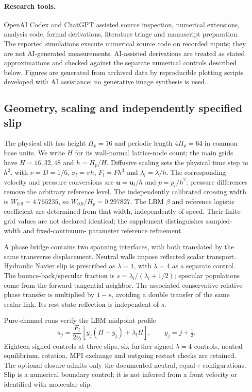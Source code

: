 \documentclass[preprint,12pt]{elsarticle}
\begin{document}
\paragraph{Research tools.}
OpenAI Codex and ChatGPT assisted source inspection, numerical
extensions, analysis code, formal derivations, literature triage and manuscript
preparation. The reported simulations execute numerical source code on
recorded inputs; they are not AI-generated measurements.
AI-assisted derivations are treated as stated approximations and checked
against the separate numerical controls described below.
Figures are generated from archived data by reproducible plotting scripts
developed with AI assistance; no generative image synthesis is used.

\subsection{Geometry, scaling and independently specified slip}
The physical slit has height $H_p=16$ and periodic length $4H_p=64$ in common
base units. We write $H$ for its wall-normal lattice-node count; the main
grids have $H=16,32,48$ and $h=H_p/H$. Diffusive scaling sets the physical
time step to $h^2$, with $\nu=D=1/6$, $\sigma_l=\sigma h$,
$F_l=Fh^3$ and $\lambda_l=\lambda/h$.
The corresponding velocity and pressure conversions are $\bm u=\bm u_l/h$
and $p=p_l/h^2$; pressure differences remove the arbitrary reference level.
The independently calibrated crossing width is
$W_{0.9}=4.765235$, so $W_{0.9}/H_p=0.297827$.
The LBM $\beta$ and reference logistic coefficient are determined from that
width, independently of speed. Their finite-grid values are not declared
identical; the supplement distinguishes sampled-width and fixed-continuum-
parameter reference refinement.

A phase bridge contains two spanning interfaces, with both translated by
the same transverse displacement. Neutral walls impose reflected scalar
transport. Hydraulic Navier slip is prescribed as $\lambda=1$, with
$\lambda=4$ as a separate control.
The bounce-back/specular fraction is
$s=\lambda_l/(\lambda_l+1/2)$; specular populations come from the forward
tangential neighbor. The associated conservative relative-phase transfer
is multiplied by $1-s$, avoiding a double transfer of the same scalar link.
Its rest-state reflection is independent of $s$.

Pure-channel runs verify the LBM midpoint profile
\begin{equation}\label{eq:slippure}
 u_j=\frac{F_l}{2\nu_l}
 [y_j(H-y_j)+\lambda_l H],\qquad y_j=j+\tfrac12.
\end{equation}
Eighteen signed controls at three slips, six further signed $\lambda=4$
controls, neutral equilibrium, rotation, MPI exchange and outgoing restart
checks are retained. The optional closure admits only the documented neutral,
equal-$\tau$ configurations. Slip is a numerical boundary control; it is
not inferred from a front velocity or identified with molecular slip.
\end{document}
